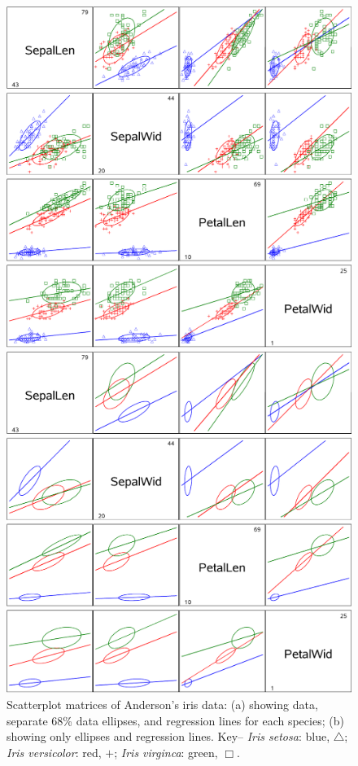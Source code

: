 \begin{figure}[htb]
  \begin{minipage}[c]{.485\textwidth}
   \includegraphics[width=1\linewidth,clip]{fig/scatirisd1}
   \end{minipage}%
  \hfill
  \begin{minipage}[c]{.485\textwidth}
   \includegraphics[width=1\linewidth,clip]{fig/scatirisd3}
  \end{minipage}
  \caption{Scatterplot matrices of Anderson's iris data: (a) showing data, separate 68\% data
  ellipses, and regression lines for each species; (b) showing only ellipses and regression lines.
  Key-- \emph{Iris setosa}: blue, $\triangle$; \emph{Iris versicolor}: red, $+$;
  \emph{Iris virginca}: green, $\Box$.}%
  \label{fig:scatirisd1}
\end{figure}


